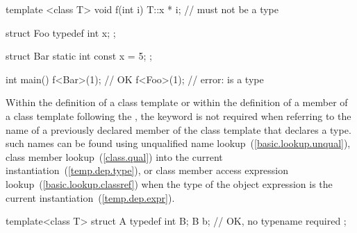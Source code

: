\begin{codeblock}
template <class T> void f(int i) {
  T::x * i;         //  must not be a type
}

struct Foo {
  typedef int x;
};

struct Bar {
  static int const x = 5;
};

int main() {
  f<Bar>(1);        // OK
  f<Foo>(1);        // error:  is a type
}
\end{codeblock}
\exitexample

\pnum
Within the definition of a class template or within the definition of a
member of a class template following the , the keyword
is not required when referring to the name of a previously
declared member of the class template that declares a type.
\enternote such names can be found using unqualified name lookup~(\ref{basic.lookup.unqual}),
class member lookup~(\ref{class.qual}) into the current instantiation~(\ref{temp.dep.type}),
or class member access expression lookup~(\ref{basic.lookup.classref}) when the
type of the object expression is the current instantiation~(\ref{temp.dep.expr}).
\exitnote
\enterexample

\begin{codeblock}
template<class T> struct A {
  typedef int B;
  B b;              // OK, no typename required
};
\end{codeblock}
\exitexample

